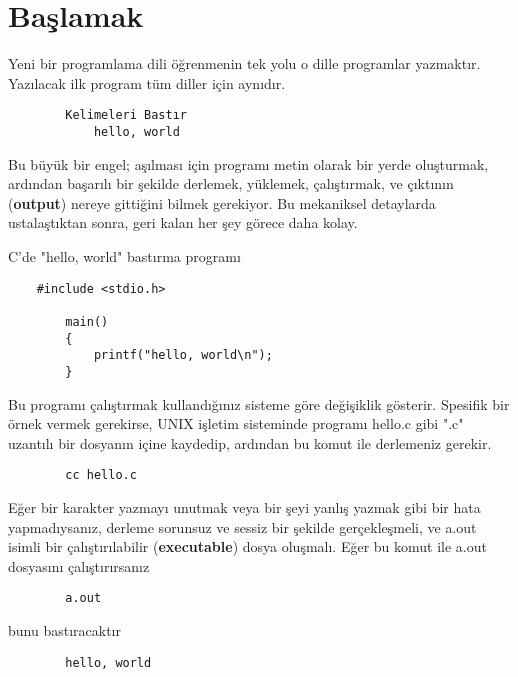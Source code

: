 \documentclass[a4paper,12pt,oneside]{book}
\begin{document}
\section{Başlamak}

Yeni bir programlama dili öğrenmenin tek yolu o dille programlar yazmaktır. Yazılacak ilk program tüm diller için aynıdır.
\begin{lstlisting}
		Kelimeleri Bastır
			hello, world
\end{lstlisting}
\par Bu büyük bir engel; aşılması için programı metin olarak bir yerde oluşturmak, ardından başarılı bir şekilde derlemek, yüklemek, çalıştırmak, ve çıktının (\textbf{output}) nereye gittiğini bilmek gerekiyor. Bu mekaniksel detaylarda ustalaştıktan sonra, geri kalan her şey görece daha kolay.
    \par C'de "hello, world" bastırma programı
\begin{lstlisting}
    #include <stdio.h>

        main()
        {
            printf("hello, world\n");
        }
\end{lstlisting}

Bu programı çalıştırmak kullandığınız sisteme göre değişiklik gösterir. Spesifik bir örnek vermek gerekirse, UNIX işletim sisteminde programı hello.c gibi ".c" uzantılı bir dosyanın içine kaydedip, ardından bu komut ile derlemeniz gerekir.
\begin{lstlisting}
		cc hello.c
\end{lstlisting}
Eğer bir karakter yazmayı unutmak veya bir şeyi yanlış yazmak gibi bir hata yapmadıysanız, derleme sorunsuz ve sessiz bir şekilde gerçekleşmeli, ve a.out isimli bir çalıştırılabilir (\textbf{executable}) dosya oluşmalı. Eğer bu komut ile a.out dosyasını çalıştırırsanız
\begin{lstlisting}
		a.out
\end{lstlisting}
bunu bastıracaktır
\begin{lstlisting}
		hello, world
\end{lstlisting}
\end{document}
